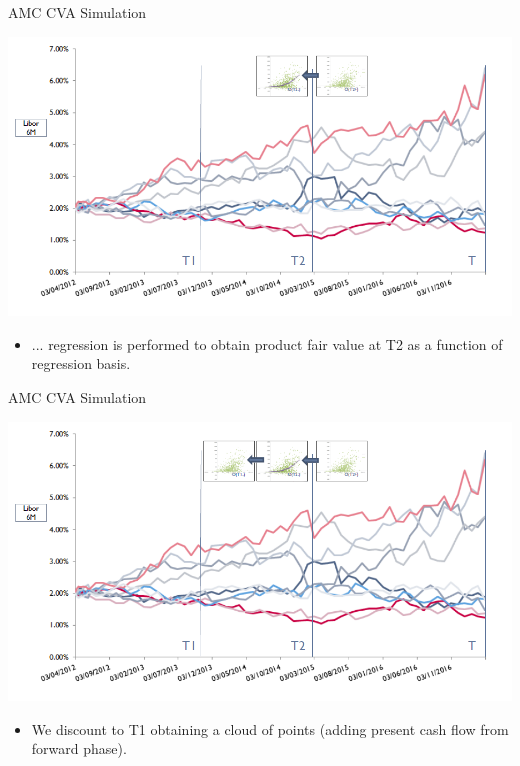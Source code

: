 \documentclass[11pt]{beamer}
\begin{document}
\begin{frame}{AMC CVA Simulation}
\begin{center}
\includegraphics[scale=.4]{img/AMC5.PNG} 
\end{center}
\begin{itemize}
\scriptsize
\item ... regression is performed to obtain product fair value at T2 as a function of regression basis. 
\normalsize
\end{itemize}
\end{frame}
\begin{frame}{AMC CVA Simulation}
\begin{center}
\includegraphics[scale=.4]{img/AMC6.PNG} 
\end{center}
\begin{itemize}
\scriptsize
\item We discount to T1 obtaining a cloud of points (adding present cash flow from forward phase). 
\normalsize
\end{itemize}
\end{frame}
\end{document}
